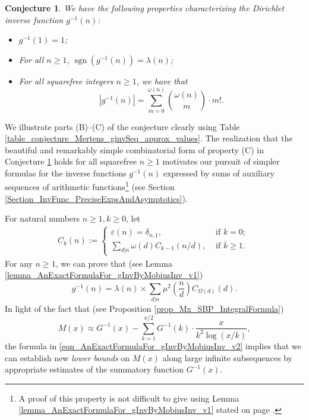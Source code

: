 \documentclass[11pt,reqno,a4letter]{article}
\numberwithin{figure}{section}
\numberwithin{table}{section}
\theoremstyle{plain}
\newtheorem{conjecture}[theorem]{Conjecture}
\numberwithin{theorem}{section}
\theoremstyle{definition}
\newcommand{\NBRef}[1]{}
\begin{document}
\NBRef{A01-2020-04-26}
\begin{conjecture}
\label{lemma_gInv_MxExample} 
We have the following properties characterizing the 
Dirichlet inverse function $g^{-1}(n)$: 
\begin{itemize} 

\item[\textbf{(A)}] $g^{-1}(1) = 1$; 
\item[\textbf{(B)}] For all $n \geq 1$, $\operatorname{sgn}(g^{-1}(n)) = \lambda(n)$; 
\item[\textbf{(C)}] For all squarefree integers $n \geq 1$, we have that 
     \[
     |g^{-1}(n)| = \sum_{m=0}^{\omega(n)} \binom{\omega(n)}{m} \cdot m!. 
     \]
\end{itemize} 
\end{conjecture} 

We illustrate parts (B)--(C) of the conjecture clearly using 
Table \ref{table_conjecture_Mertens_ginvSeq_approx_values}. 
The realization that the beautiful and remarkably simple combinatorial form of property (C) 
in Conjecture \ref{lemma_gInv_MxExample} holds for all squarefree $n \geq 1$ 
motivates our pursuit of simpler formulas for the inverse functions $g^{-1}(n)$ 
expressed by sums of auxiliary sequences of arithmetic functions\footnote{ 
     A proof of this property is not difficult to give using 
     Lemma \ref{lemma_AnExactFormulaFor_gInvByMobiusInv_v1} 
     stated on page \pageref{lemma_AnExactFormulaFor_gInvByMobiusInv_v1}. 
} 
(see Section \ref{Section_InvFunc_PreciseExpsAndAsymptotics}). 

For natural numbers $n \geq 1, k \geq 0$, let 
\begin{align*} 
C_k(n) := \begin{cases} 
     \varepsilon(n) = \delta_{n,1}, & \text{ if $k = 0$; } \\ 
     \sum\limits_{d|n} \omega(d) C_{k-1}(n/d), & \text{ if $k \geq 1$. } 
     \end{cases} 
\end{align*} 
For any $n \geq 1$, we can prove that (see Lemma \ref{lemma_AnExactFormulaFor_gInvByMobiusInv_v1})
\begin{equation} 
\label{eqn_AnExactFormulaFor_gInvByMobiusInv_v2} 
g^{-1}(n) = \lambda(n) \times \sum_{d|n} \mu^2\left(\frac{n}{d}\right) C_{\Omega(d)}(d). 
\end{equation} 
In light of the fact that (see Proposition \ref{prop_Mx_SBP_IntegralFormula}) 
\[
M(x) \approx G^{-1}(x) - \sum_{k=1}^{x/2} G^{-1}(k) \cdot \frac{x}{k^2 \log(x/k)}, 
\]
the formula in \eqref{eqn_AnExactFormulaFor_gInvByMobiusInv_v2} 
implies that we can establish new \emph{lower bounds} on $M(x)$ along large infinite subsequences 
by appropriate estimates of the summatory function $G^{-1}(x)$. 
\end{document}
